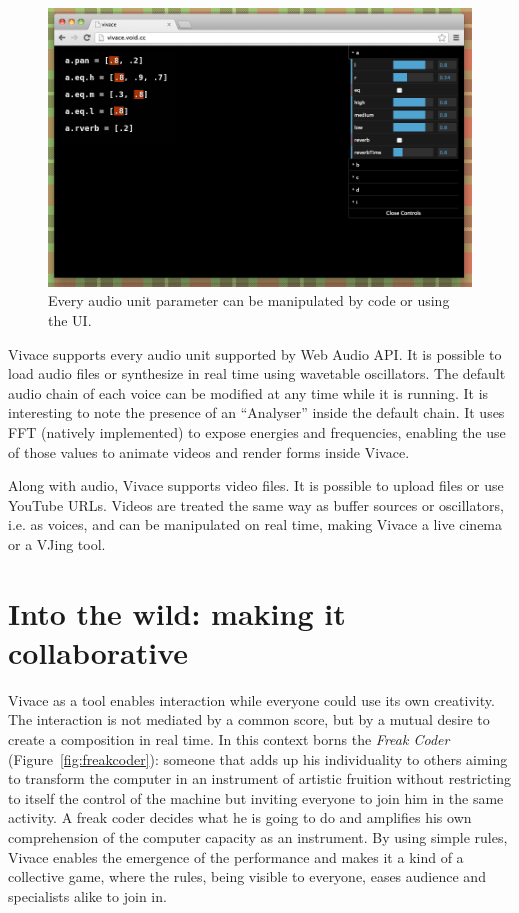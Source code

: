 \documentclass[letterpaper, 12pt]{article}
\begin{document}
\begin{figure}[htpb]
  \begin{center}
    \includegraphics[scale=.3]{img/fig_ui.png}
    \caption{Every audio unit parameter can be manipulated by code or
      using the UI.}
    \label{fig:ui}
  \end{center}
\end{figure}

Vivace supports every audio unit supported by Web Audio API. It is
possible to load audio files or synthesize in real time using
wavetable oscillators. The default audio chain of each voice can be
modified at any time while it is running. It is interesting to note
the presence of an ``Analyser'' inside the default chain. It uses FFT
(natively implemented) to expose energies and frequencies, enabling
the use of those values to animate videos and render forms inside
Vivace.

Along with audio, Vivace supports video files. It is possible to
upload files or use YouTube URLs. Videos are treated the same way as
buffer sources or oscillators, i.e. as voices, and can be manipulated
on real time, making Vivace a live cinema or a VJing tool.

\section{Into the wild: making it collaborative}

Vivace as a tool enables interaction while everyone could use its own
creativity. The interaction is not mediated by a common score, but by
a mutual desire to create a composition in real time. In this context
borns the \emph{Freak Coder} (Figure~\ref{fig:freakcoder}): someone
that adds up his individuality to others aiming to transform the
computer in an instrument of artistic fruition without restricting to
itself the control of the machine but inviting everyone to join him in
the same activity. A freak coder decides what he is going to do and
amplifies his own comprehension of the computer capacity as an
instrument. By using simple rules, Vivace enables the emergence of the
performance and makes it a kind of a collective game, where the rules,
being visible to everyone, eases audience and specialists alike to
join in.
\end{document}
